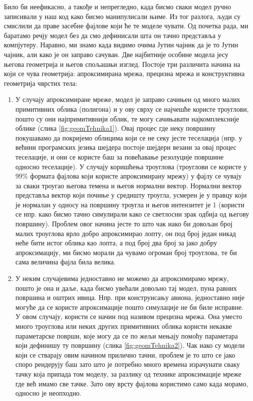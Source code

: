 \documentclass[12pt]{article}
\begin{document}
	Било би неефикасно, а такође и непрегледно, када бисмо сваки модел ручно записивали у наш код како бисмо манипулисали њиме. Из тог разлога, људи су смислили да праве засебне фајлове који ће те моделе чувати. Од почетка рада, ми баратамо речју модел без да смо дефинисали шта он тачно представља у компјутеру. Наравно, ми знамо када видимо очима Јутин чајник да је то Јутин чајник, али како је он заправо сачуван. Две најбитније особине модела јесу његова геометрија и његов спољашњи изглед.
	Постоје три различита начина на који се чува геометрија: апроксимирана мрежа, прецизна мрежа и конструктивна геометрија чврстих тела:
	\begin{enumerate}
	\item У случају апроксимиране мреже, модел је заправо сачињен од много малих примитивних облика (полигона) и у ову сврху се најчешће користе троуглови, пошто су они најпримитивнији облик, те могу сачињавати најкомплексније облике (слика \ref{fig:geomTehnika1}). Овај процес где неку површину покушавамо да покријемо облицима који се не секу јесте теселација (нпр. у већини програмских језика шејдера постоје шејдери везани за овај процес теселације, и они се користе баш за повећавање резолуције површине односно теселације). У случају коришћења троуглова (троуглови се користе у 99\% формата фајлова који користе апроксимирану мрежу) у фајлу се чувају за сваки троугао његова темена и његов нормални вектор. Нормални вектор представља вектор који почиње у средишту троугла, усмерен је у правцу који је нормалан у односу на површину троугла и његов интензитет је 1 (користи се нпр. како бисмо тачно симулирали како се светлосни зрак одбија од његову површину). Проблем овог начина јесте то што чак иако би довољан број малих троуглова врло добро апроксимирао лопту, он под број један никад неће бити истог облика као лопта, а под број два број за јако добру апроксимацију, ми бисмо морали да чувамо огроман број троуглова, те би сама величина фајла била велика.
	\item У неким случајевима једноставно не можемо да апроксимирамо мрежу, пошто је она и даље, када бисмо увећали довољно тај модел, пуна равних површина и оштрих ивица. Нпр. при конструисању авиона, једноставно није могуће да се користе апроксимације пошто симулације не би биле исправне. У овом случају, користи се начин под називом прецизна мрежа. Она уместо много троуглова или неких других примитивних облика користи некакве параметарске површи, које могу да се по жељи мењају помоћу параметара који дефинишу ту површину (слика \ref{fig:geomTehnika2}). Чак иако су модели који се стварају овим начином прилично тачни, проблем је то што се јако споро рендерују баш зато што је потребно много времена израчунати сваку тачку која припада том моделу, за разлику од технике апроксимације мреже где већ имамо све тачке. Зато ову врсту фајлова користимо само када морамо, односно је неопходно.

\end{enumerate}
\end{document}
